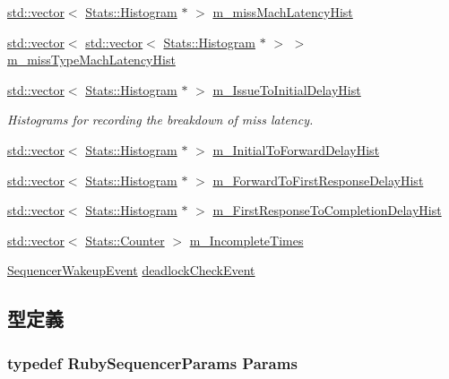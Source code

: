 \begin{DoxyCompactItemize}
\item 
\hyperlink{classstd_1_1vector}{std::vector}$<$ \hyperlink{classStats_1_1Histogram}{Stats::Histogram} $\ast$ $>$ \hyperlink{classSequencer_a55e994bce4da18f7600be6cbf7a4a3b5}{m\_\-missMachLatencyHist}
\item 
\hyperlink{classstd_1_1vector}{std::vector}$<$ \hyperlink{classstd_1_1vector}{std::vector}$<$ \hyperlink{classStats_1_1Histogram}{Stats::Histogram} $\ast$ $>$ $>$ \hyperlink{classSequencer_a8e022aebc37a4b83df56956874befd75}{m\_\-missTypeMachLatencyHist}
\item 
\hyperlink{classstd_1_1vector}{std::vector}$<$ \hyperlink{classStats_1_1Histogram}{Stats::Histogram} $\ast$ $>$ \hyperlink{classSequencer_a503562ca3d885333c87da80d05ee612a}{m\_\-IssueToInitialDelayHist}
\begin{DoxyCompactList}\small\item\em Histograms for recording the breakdown of miss latency. \item\end{DoxyCompactList}\item 
\hyperlink{classstd_1_1vector}{std::vector}$<$ \hyperlink{classStats_1_1Histogram}{Stats::Histogram} $\ast$ $>$ \hyperlink{classSequencer_a0dbfb83f6edf61cad3d0aebdc89ed370}{m\_\-InitialToForwardDelayHist}
\item 
\hyperlink{classstd_1_1vector}{std::vector}$<$ \hyperlink{classStats_1_1Histogram}{Stats::Histogram} $\ast$ $>$ \hyperlink{classSequencer_ae9bea11c9b001a155e7f7a0f39ac7bf9}{m\_\-ForwardToFirstResponseDelayHist}
\item 
\hyperlink{classstd_1_1vector}{std::vector}$<$ \hyperlink{classStats_1_1Histogram}{Stats::Histogram} $\ast$ $>$ \hyperlink{classSequencer_a6236c49462f2162310ca62569ec869ac}{m\_\-FirstResponseToCompletionDelayHist}
\item 
\hyperlink{classstd_1_1vector}{std::vector}$<$ \hyperlink{namespaceStats_ac35128c026c72bb36af9cea00774e8a6}{Stats::Counter} $>$ \hyperlink{classSequencer_a42ce5f1f915ac19c7e7575172f28e412}{m\_\-IncompleteTimes}
\item 
\hyperlink{classSequencer_1_1SequencerWakeupEvent}{SequencerWakeupEvent} \hyperlink{classSequencer_a1898c82aec1a510eaa5aa55cb23a5bc3}{deadlockCheckEvent}
\end{DoxyCompactItemize}


\subsection{型定義}
\hypertarget{classSequencer_a55b8bba242820df379c5d9139a854e5b}{
\subsubsection[{Params}]{\setlength{\rightskip}{0pt plus 5cm}typedef RubySequencerParams {\bf Params}}}
\label{classSequencer_a55b8bba242820df379c5d9139a854e5b}


